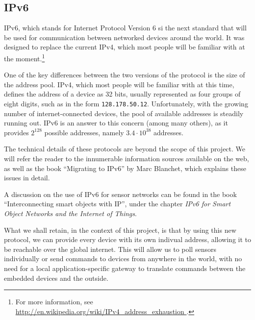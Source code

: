 %


\subsection{IPv6}\label{sub:ipv6}

IPv6, which stands for Internet Protocol Version 6 si the next standard that
will be used for communication between networked devices around the world. It
was designed to replace the current IPv4, which most people will be familiar
with at the moment.\footnote{For more information, see \url{
http://en.wikipedia.org/wiki/IPv4_address_exhaustion }.}

One of the key differences between the two versions of the protocol is the size
of the address pool. IPv4, which most people will be familiar with at this time,
defines the address of a device as 32 bits, usually represented as four groups
of eight digits, such as in the form \texttt{128.178.50.12}. Unfortunately, with
the growing number of internet-connected devices, the pool of available
addresses is steadily running out. IPv6 is an answer to this concern (among many
others), as it provides $2^{128}$ possible addresses, namely $3.4 \cdot 10^{38}$
addresses. 

The technical details of these protocols are beyond the scope of this project.
We will refer the reader to the innumerable information sources available on the
web, as well as the book ``Migrating to IPv6'' by Marc
Blanchet\citep{blanchet2006}, which explains these issues in detail.

A discussion on the use of IPv6 for sensor networks can be found in the book
``Interconnecting smart objects with IP''\citep[chap. 4]{dunkels2010}, under the chapter
\emph{IPv6 for Smart Object Networks and the Internet of Things}.

What we shall retain, in the context of this project, is that by using this new
protocol, we can provide every device with its own indivual address, allowing it
to be reachable over the global internet. This will allow us to poll sensors
individually or send commands to devices from anywhere in the world, with no
need for a local application-specific gateway to translate commands between the
embedded devices and the outside.

